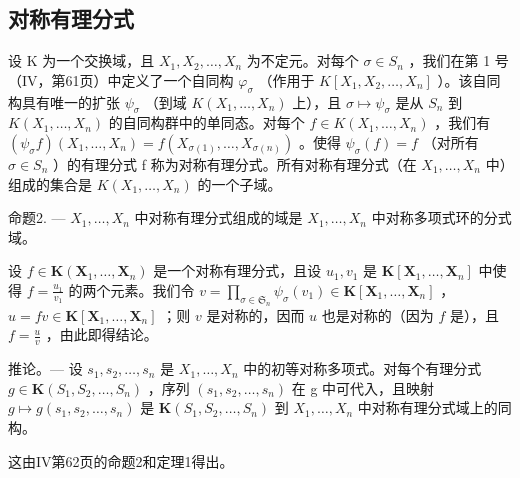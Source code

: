 \subsection{对称有理分式}

设 K 为一个交换域，且 \(X_{1}, X_{2}, \ldots, X_{n}\) 为不定元。对每个 \(\sigma \in S_{n}\) ，我们在第 1 号（IV，第61页）中定义了一个自同构 \(\varphi_{\sigma}\) （作用于 \(K[X_{1}, X_{2}, \ldots, X_{n}]\) ）。该自同构具有唯一的扩张 \(\psi_{\sigma}\) （到域 \(K(X_{1}, \ldots, X_{n})\) 上），且 \(\sigma \mapsto \psi_{\sigma}\) 是从 \(S_{n}\) 到 \(K(X_{1}, \ldots, X_{n})\) 的自同构群中的单同态。对每个 \(f \in K(X_{1}, \ldots, X_{n})\) ，我们有 \((\psi_{\sigma} f) (X_{1}, \ldots, X_{n}) = f(X_{\sigma(1)}, \ldots, X_{\sigma(n)})\) 。使得 \(\psi_{\sigma}(f) = f\) （对所有 \(\sigma \in S_{n}\) ）的有理分式 f 称为对称有理分式。所有对称有理分式（在 \(X_{1}, \ldots, X_{n}\) 中）组成的集合是 \(K(X_{1}, \ldots, X_{n})\) 的一个子域。

命题2. --- \(X_{1}, \ldots, X_{n}\) 中对称有理分式组成的域是 \(X_{1}, \ldots, X_{n}\) 中对称多项式环的分式域。

设 \(f \in \mathbf{K}(\mathbf{X}_1, \ldots, \mathbf{X}_n)\) 是一个对称有理分式，且设 \(u_1, v_1\) 是 \(\mathbf{K}[\mathbf{X}_1, \ldots, \mathbf{X}_n]\) 中使得 \(f = \frac{u_1}{v_1}\) 的两个元素。我们令 \(v = \prod_{\sigma \in \mathfrak{S}_n} \psi_\sigma(v_1) \in \mathbf{K}[\mathbf{X}_1, \ldots, \mathbf{X}_n]\) ， \(u = fv \in \mathbf{K}[\mathbf{X}_1, \ldots, \mathbf{X}_n]\) ；则 \(v\) 是对称的，因而 \(u\) 也是对称的（因为 \(f\) 是），且 \(f = \frac{u}{v}\) ，由此即得结论。

推论。--- 设 \(s_{1}, s_{2}, \ldots, s_{n}\) 是 \(X_{1}, \ldots, X_{n}\) 中的初等对称多项式。对每个有理分式 \(g \in \mathbf{K}(S_{1}, S_{2}, \ldots, S_{n})\) ，序列 \((s_{1}, s_{2}, \ldots, s_{n})\) 在 g 中可代入，且映射 \(g \mapsto g(s_{1}, s_{2}, \ldots, s_{n})\) 是 \(\mathbf{K}(S_{1}, S_{2}, \ldots, S_{n})\) 到 \(X_{1}, \ldots, X_{n}\) 中对称有理分式域上的同构。

这由IV第62页的命题2和定理1得出。

